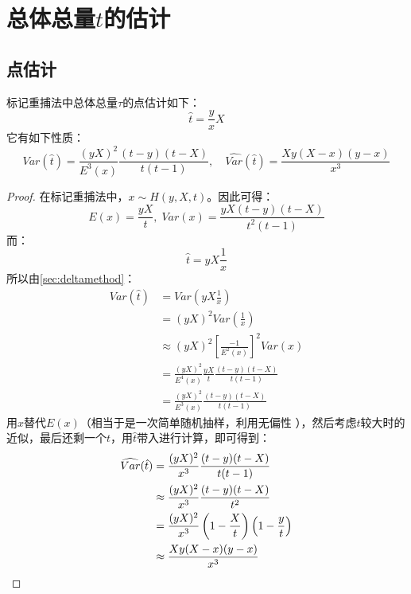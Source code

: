 \section{总体总量$t$的估计}

\subsection{点估计}
\begin{theorem}
	标记重捕法中总体总量$\tau$的点估计如下：
	\begin{equation*}
		\hat{t}=\frac{y}{x}X 
	\end{equation*}
	它有如下性质：
	\begin{equation*}
		Var(\hat{t})=\frac{(yX)^2}{E^3(x)}\frac{(t-y)(t-X)}{t(t-1)},\quad
		\widehat{Var}(\hat{t})=\frac{Xy(X-x)(y-x)}{x^3}
	\end{equation*}
\end{theorem}
\begin{proof}
	在标记重捕法中，$x\sim H(y,X,t)$。因此可得：
	\begin{equation*}
		E(x)=\frac{yX}{t},\;
		Var(x)=\frac{yX(t-y)(t-X)}{t^2(t-1)}
	\end{equation*}
	而：
	\begin{equation*}
		\hat{t}=yX\frac{1}{x}
	\end{equation*}
	所以由\cref{sec:deltamethod}：
	\begin{align*}
		Var(\hat{t})&=Var\left(yX\frac{1}{x}\right) \\
		&=(yX)^2Var\left(\frac{1}{x}\right) \\
		&\approx(yX)^2\left[\frac{-1}{E^2(x)}\right]^2Var(x) \\
		&=\frac{(yX)^2}{E^4(x)}\frac{yX}{t}\frac{(t-y)(t-X)}{t(t-1)} \\
		&=\frac{(yX)^2}{E^3(x)}\frac{(t-y)(t-X)}{t(t-1)}
	\end{align*}
	用$x$替代$E(x)$（相当于是一次简单随机抽样，利用无偏性
	），然后考虑$t$较大时的近似，最后还剩一个$t$，用$\hat{t}$带入进行计算，即可得到：
	\begin{align*}
		\widehat{Var}(\hat{t})&=\frac{(yX)^2}{x^3}\frac{(t-y)(t-X)}{t(t-1)} \\
		&\approx\frac{(yX)^2}{x^3}\frac{(t-y)(t-X)}{t^2} \\
		&=\frac{(yX)^2}{x^3}\left(1-\frac{X}{t}\right)\left(1-\frac{y}{t}\right) \\
		&\approx\frac{Xy(X-x)(y-x)}{x^3}\qedhere
	\end{align*}
\end{proof}
